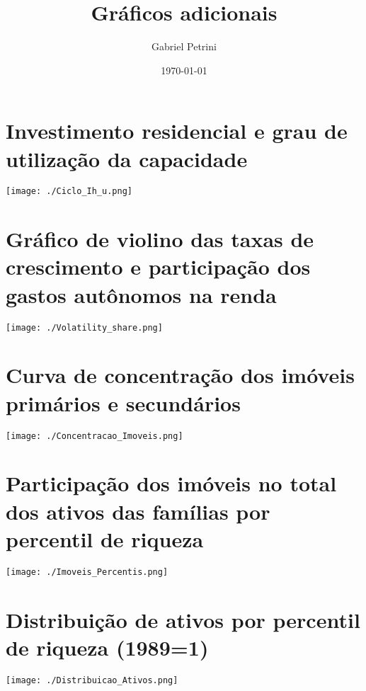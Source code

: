 \documentclass[11pt]{article}
\author{Gabriel Petrini}
\date{\today}
\title{Gráficos adicionais}
\begin{document}
\maketitle
\tableofcontents


\section*{Investimento residencial e grau de utilização da capacidade}
\label{sec:orge5526a1}

\begin{center}
\texttt{[image: ./Ciclo\_Ih\_u.png]}
\end{center}

\section*{Gráfico de violino das taxas de crescimento e participação dos gastos autônomos na renda}
\label{sec:org2c9fc52}

\begin{center}
\texttt{[image: ./Volatility\_share.png]}
\end{center}

\section*{Curva de concentração dos imóveis primários e secundários}
\label{sec:orgf2dbf66}

\begin{center}
\texttt{[image: ./Concentracao\_Imoveis.png]}
\end{center}

\section*{Participação dos imóveis no total dos ativos das famílias por percentil de riqueza}
\label{sec:orge7151fc}

\begin{center}
\texttt{[image: ./Imoveis\_Percentis.png]}
\end{center}

\section*{Distribuição de ativos por percentil de riqueza (1989=1)}
\label{sec:orgaba79a0}

\begin{center}
\texttt{[image: ./Distribuicao\_Ativos.png]}
\end{center}
\end{document}
